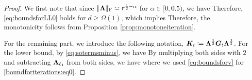 \begin{proof}
We first note that since $\lVert\boldsymbol{\Lambda}\rVert_\mathrm{F} \asymp r^{\frac{1}{2} - \alpha}$ for  $\alpha \in [0,0.5)$, we have
Therefore,     \eqref{eq:boundsforLL0} holds for $d \geq \Omega(1)$,  which implies
Therefore, the monotonicity follows from Proposition \ref{prop:monotoneiteration}.

For the remaining part, we introduce the following notation, $\boldsymbol{K}_t \coloneqq   \boldsymbol{\Lambda}^{\frac{1}{2}} \boldsymbol{G}_t  \boldsymbol{\Lambda}^{\frac{1}{2}}$.
For the lower bound,  by \eqref{eq:sotermsminus},  we have
By multiplying both sides with $2$ and subtracting  $ \boldsymbol{\Lambda}_{\ell_1}$ from both sides, we have
where we used  \eqref{eq:boundsforv} for \eqref{boundforiterations:eq0}.


\end{proof}
